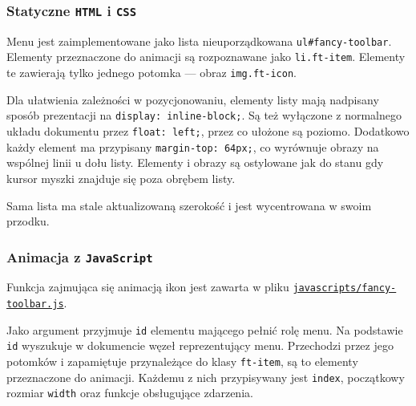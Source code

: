 \documentclass[10pt,a4paper]{article}
\newcommand{\f}[1]{\texttt{#1}}
\begin{document}
\subsubsection{Statyczne \f{HTML} i \f{CSS}}
Menu jest zaimplementowane jako lista nieuporządkowana \f{ul\#fancy-toolbar}.
Elementy przeznaczone do animacji są rozpoznawane jako \f{li.ft-item}. Elementy
te zawierają tylko jednego potomka --- obraz \f{img.ft-icon}.

Dla ułatwienia zależności w pozycjonowaniu, elementy listy mają nadpisany sposób
prezentacji na \f{display: inline-block;}. Są też wyłączone z normalnego układu
dokumentu przez \f{float: left;}, przez co ułożone są poziomo. Dodatkowo każdy
element ma przypisany \f{margin-top: 64px;}, co wyrównuje obrazy na wspólnej
linii u dołu listy. Elementy i obrazy są ostylowane jak do stanu gdy kursor
myszki znajduje się poza obrębem listy.

Sama lista ma stale aktualizowaną szerokość i jest wycentrowana w swoim przodku.

\subsubsection{Animacja z \f{JavaScript}}

Funkcja zajmująca się animacją ikon jest zawarta w pliku
\href{https://github.com/student-tomasz/pi-cwiczenie-2/tree/b3f54b187e99c161f7a6780524f504c9fd1b00dd/javascripts/fancy-toolbar.js}{\f{javascripts/fancy-toolbar.js}}.

Jako argument przyjmuje \f{id} elementu mającego pełnić rolę menu. Na podstawie
\f{id} wyszukuje w dokumencie węzeł reprezentujący menu. Przechodzi przez jego
potomków i zapamiętuje przynależące do klasy \f{ft-item}, są to elementy
przeznaczone do animacji. Każdemu z nich przypisywany jest \f{index}, początkowy
rozmiar \f{width} oraz funkcje obsługujące zdarzenia.
\end{document}
